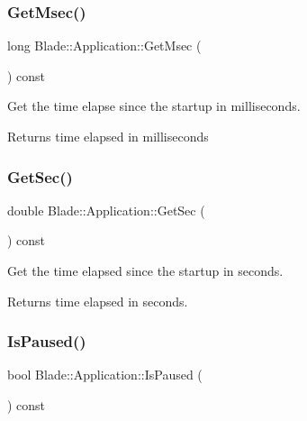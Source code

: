 \subsubsection{\texorpdfstring{Get\+Msec()}{GetMsec()}}
{\footnotesize\ttfamily long Blade\+::\+Application\+::\+Get\+Msec (\begin{DoxyParamCaption}{ }\end{DoxyParamCaption}) const\hspace{0.3cm}{\ttfamily [noexcept]}}



Get the time elapse since the startup in milliseconds. 

\begin{DoxyReturn}{Returns}
time elapsed in milliseconds 
\end{DoxyReturn}
\mbox{\label{class_blade_1_1_application_a025118e872031944df57560e820cfde2}} 
\subsubsection{\texorpdfstring{Get\+Sec()}{GetSec()}}
{\footnotesize\ttfamily double Blade\+::\+Application\+::\+Get\+Sec (\begin{DoxyParamCaption}{ }\end{DoxyParamCaption}) const\hspace{0.3cm}{\ttfamily [noexcept]}}



Get the time elapsed since the startup in seconds. 

\begin{DoxyReturn}{Returns}
time elapsed in seconds. 
\end{DoxyReturn}
\mbox{\label{class_blade_1_1_application_a80cb2abe5d175dde76be4f461bd82183}} 
\subsubsection{\texorpdfstring{Is\+Paused()}{IsPaused()}}
{\footnotesize\ttfamily bool Blade\+::\+Application\+::\+Is\+Paused (\begin{DoxyParamCaption}{ }\end{DoxyParamCaption}) const\hspace{0.3cm}{\ttfamily [noexcept]}}



